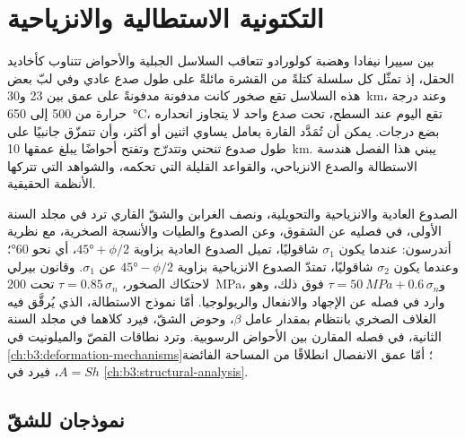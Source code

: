 \chapter{التكتونية الاستطالية والانزياحية}\label{ch:b3:extension-strike-slip}

بين سييرا نيفادا وهضبة كولورادو تتعاقب السلاسل الجبلية والأحواض
تتناوب كأخاديد الحقل، إذ تمثّل كل سلسلة كتلةً من القشرة مائلةً على طول صدع عادي
وفي لبّ بعض هذه السلاسل تقع صخور كانت مدفونة
مدفونةً على عمق بين 23 و\qty{30}{km}، وعند درجة حرارة من 500 إلى \qty{650}{\celsius}، تقع اليوم عند
السطح، تحت صدع واحد لا يتجاوز انحداره بضع درجات.
يمكن أن تُمَدَّد القارة بعامل يساوي اثنين أو أكثر، وأن تتمزّق جانبيًا على طول صدوع
تنحني وتتدرّج وتفتح أحواضًا يبلغ عمقها \qty{10}{km}. يبني هذا الفصل
هندسة الاستطالة والصدع الانزياحي، والقواعد القليلة التي
تحكمه، والشواهد التي تتركها الأنظمة الحقيقية.

\begin{recall}
الصدوع العادية والانزياحية والتحويلية، ونصف الغرابن والشقّ القاري
ترد في مجلد السنة الأولى، في فصليه عن الشقوق، وعن الصدوع والطيات
والأنسجة الصخرية، مع نظرية أندرسون: عندما يكون $\sigma_1$ شاقوليًا، تميل الصدوع العادية
بزاوية $\ang{45} + \phi/2$، أي نحو \ang{60}؛ وعندما يكون $\sigma_2$ شاقوليًا، تمتدّ الصدوع الانزياحية
بزاوية $\ang{45} - \phi/2$ عن $\sigma_1$. وقانون بيرلي لاحتكاك الصخور،
$\tau = 0.85\,\sigma_n$ تحت \qty{200}{MPa}، و$\tau =
\qty{50}{MPa} + 0.6\,\sigma_n$ فوق ذلك، وهو وارد في فصله عن الإجهاد والانفعال
والريولوجيا. أمّا نموذج الاستطالة، الذي يُرقَّق فيه الغلاف الصخري بانتظام
بمقدار عامل $\beta$، وحوض الشقّ، فيرد كلاهما في مجلد السنة الثانية، في فصله
المقارن بين الأحواض الرسوبية. وترد نطاقات القصّ والميلونيت في
\cref{ch:b3:deformation-mechanisms}؛ أمّا عمق الانفصال انطلاقًا من المساحة الفائضة
$A = Sh$، فيرد في \cref{ch:b3:structural-analysis}.
\end{recall}

\section{نموذجان للشقّ}\label{sec:b3:extension-strike-slip:models}

